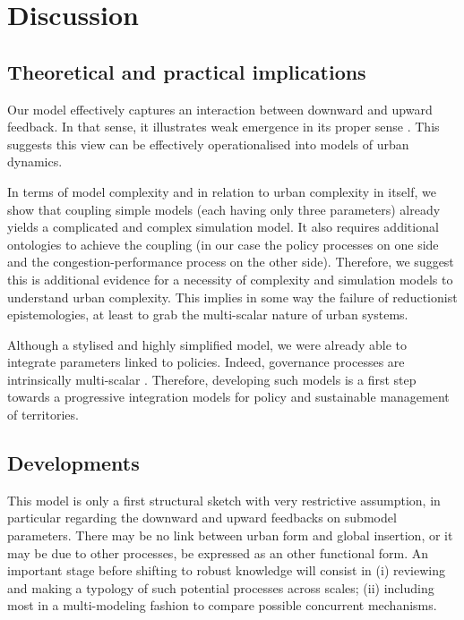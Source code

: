 \documentclass[ijgi,article,submit,moreauthors,pdftex]{Definitions/mdpi}
\begin{document}
\section{Discussion}



\subsection{Theoretical and practical implications}

Our model effectively captures an interaction between downward and upward feedback. In that sense, it illustrates weak emergence in its proper sense \cite{bedau2002downward}. This suggests this view can be effectively operationalised into models of urban dynamics.

In terms of model complexity and in relation to urban complexity in itself, we show that coupling simple models (each having only three parameters) already yields a complicated and complex simulation model. It also requires additional ontologies to achieve the coupling (in our case the policy processes on one side and the congestion-performance process on the other side). Therefore, we suggest this is additional evidence for a necessity of complexity and simulation models to understand urban complexity. This implies in some way the failure of reductionist epistemologies, at least to grab the multi-scalar nature of urban systems.

Although a stylised and highly simplified model, we were already able to integrate parameters linked to policies. Indeed, governance processes are intrinsically multi-scalar \cite{liao2017ouverture}. Therefore, developing such models is a first step towards a progressive integration models for policy and sustainable management of territories.


\subsection{Developments}


This model is only a first structural sketch with very restrictive assumption, in particular regarding the downward and upward feedbacks on submodel parameters. There may be no link between urban form and global insertion, or it may be due to other processes, be expressed as an other functional form. An important stage before shifting to robust knowledge will consist in (i) reviewing and making a typology of such potential processes across scales; (ii) including most in a multi-modeling fashion to compare possible concurrent mechanisms.
\end{document}
